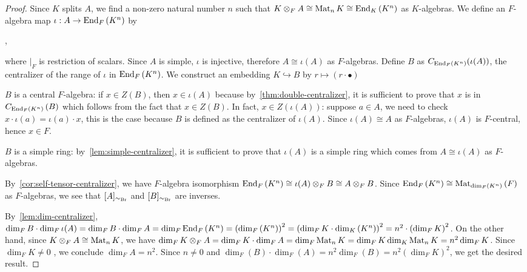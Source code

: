 \begin{proof}
   Since $K$ splits $A$, we find a non-zero natural number $n$ such that $K\otimes_{F}A\cong\operatorname{Mat}_{n}K\cong\operatorname{End}_{K}\left(K^{n}\right)$ as $K$-algebras.
   We define an $F$-algebra map $\iota: A\to\operatorname{End}_{F}\left(K^{n}\right)$ by
   \begin{center}
     ,
   \end{center}
   where $|_{F}$ is restriction of scalars. Since $A$ is simple, $\iota$ is injective, therefore $A \cong \iota(A)$ as $F$-algebras. Define $B$ as $C_{\operatorname{End}_{F}\left(K^{n}\right)}(\iota(A))$, the centralizer of the range of $\iota$ in $\operatorname{End}_{F}\left(K^{n}\right)$.
   We construct an embedding $K \hookrightarrow B$ by $r \mapsto (r \cdot \bullet)$

   $B$ is a central $F$-algebra: if $x \in Z(B)$, then $x \in \iota(A)$ because by~\cref{thm:double-centralizer}, it is sufficient to prove that $x$ is in $C_{\operatorname{End}_{F}\left(K^{n}\right)}\left(B\right)$ which follows from the fact that $x \in Z(B)$. In fact, $x \in Z(\iota(A))$: suppose $a \in A$, we need to check $x \cdot \iota(a) = \iota(a)\cdot x$, this is the case because $B$ is defined as the centralizer of $\iota(A)$. Since $\iota(A) \cong A$ as $F$-algebras, $\iota(A)$ is $F$-central, hence $x \in F$.

   $B$ is a simple ring: by~\cref{lem:simple-centralizer}, it is sufficient to prove that $\iota(A)$ is a simple ring which comes from $A \cong \iota(A)$ as $F$-algebras.

   By~\cref{cor:self-tensor-centralizer}, we have $F$-algebra isomorphism $\operatorname{End}_{F}\left(K^{n}\right)\cong \iota(A)\otimes_{F}B \cong A \otimes_{F}B$. Since $\operatorname{End}_{F}\left(K^{n}\right)\cong\operatorname{Mat}_{\dim_{F}\left(K^{n}\right)}\left(F\right)$ as $F$-algebras, we see that $[A]_{\sim_{\operatorname{Br}}}$ and $[B]_{\sim_{\operatorname{Br}}}$ are inverses.

   By~\cref{lem:dim-centralizer}, $\dim_{F}B\cdot \dim_{F}\iota(A) = \dim_{F}B\cdot\dim_{F}A = \dim_{F}\operatorname{End}_{F}\left(K^{n}\right) = {\left(\dim_{F}\left(K^{n}\right)\right)}^{2}={\left(\dim_{F}K\cdot \dim_{K}\left(K^{n}\right)\right)}^{2}=n^{2}\cdot{\left(\dim_{F}K\right)}^{2}$. On the other hand, since $K\otimes_{F}A\cong\operatorname{Mat}_{n}K$, we have $\dim_{F}K\otimes_{F}A=\dim_{F}K\cdot\dim_{F}A=\dim_{F}\operatorname{Mat}_{n}K=\dim_{F}K\dim_{K}\operatorname{Mat}_{n}K=n^{2}\dim_{F}K$. Since $\dim_{F}K\ne 0$ , we conclude $\dim_{F}A=n^{2}$. Since $n\ne 0$ and $\dim_{F}(B)\cdot \dim_{F}(A)=n^{2}\dim_{F}(B)=n^{2}{\left(\dim_{F}K\right)}^{2}$, we get the desired result.

 \end{proof}

